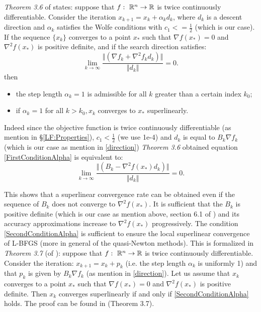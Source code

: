 \textit{Theorem 3.6} of \cite{numerical} states: suppose that $f: \textnormal{ }\mathbb{R}^n \rightarrow \mathbb{R}$ is twice continuously differentiable. Consider the iteration $x_{k+1} = x_{k} + \alpha_{k}d_{k}$, where $d_{k}$ is a descent direction and $\alpha_{k}$ satisfies the Wolfe conditions with $c_{1} <= \frac{1}{2}$ (which is our case). If the sequence $\{ x_{k} \}$ converges to a point $x_{*}$ such that $\nabla f(x_{*}) = 0$ and $\nabla^2f(x_{*})$ is positive definite, and if the search direction satisfies: 
\begin{equation}
\label{FirstConditionAlpha}
 \lim_{k\to\infty}\frac{\Vert (\nabla f_{k} + \nabla^2 f_{k} d_{k})\Vert}{\Vert d_{k} \Vert} = 0.
\end{equation} 
then 
\begin{itemize}
	\item the step length $\alpha_{k} = 1$ is admissible for all $k$ greater than a certain index $k_{0}$;
	\item if $\alpha_{k} = 1$ for all $k>k_{0}, x_{k}$ converges to $x_{*}$ superlinearly.
\end{itemize}

 Indeed since the objective function is twice continuously differentiable (as mention in \S \ref{LF:Properties}), $c_{1}<\frac{1}{2}$ (we use 1e-4) and $d_{k}$ is equal to $B_{k}\nabla f_{k}$ (which is our case as mention in \ref{direction}) \textit{Theorem 3.6} obtained equation \ref{FirstConditionAlpha} is equivalent to: 
\begin{equation}
\label{SecondConditionAlpha}
 \lim_{k\to\infty}\frac{\Vert (B_{k} - \nabla^2f(x_*) d_{k})\Vert}{\Vert d_{k} \Vert} = 0.
\end{equation}

This shows that a superlinear convergence rate can be obtained even if the sequence of $B_{k}$ does not converge to $\nabla^2f(x_*)$. It is sufficient that the $B_{k}$ is positive definite (which is our case as mention above, section 6.1 of \cite{numerical}) and its accuracy approximations increase to $\nabla^2f(x_*)$ progressively. The condition \ref{SecondConditionAlpha} is sufficient to ensure the local superlinear convergence of L-BFGS (more in general of the quasi-Newton methods). This is formalized in \textit{Theorem 3.7} (of \cite{numerical}):
suppose that $f: \textnormal{ }\mathbb{R}^n \rightarrow \mathbb{R}$ is twice continuously differentiable. Consider the iteration: $x_{k+1}=x_{k} + p_{k}$ (i.e. the step length $\alpha_{k}$ is uniformly 1) and that $p_{k}$ is given by $B_{k}\nabla f_{k}$ (as mention in \ref{direction}). Let us assume that $x_{k}$ converges to a point $x_{*}$ such that $\nabla f(x_{*}) = 0$ and $\nabla^2f(x_{*})$ is positive definite. Then $x_{k}$ converges superlinearly if and only if \ref{SecondConditionAlpha} holds. The proof can be found in \cite{numerical} (Theorem 3.7). 

